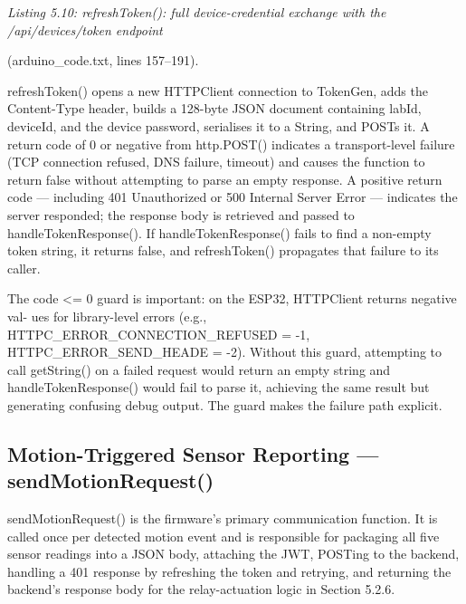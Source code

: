 \textit{Listing 5.10: refreshToken(): full device-credential exchange with the /api/devices/token endpoint}

(arduino\_code.txt, lines 157--191).


refreshToken() opens a new HTTPClient connection to TokenGen, adds the Content-Type
header, builds a 128-byte JSON document containing labId, deviceId, and the device
password, serialises it to a String, and POSTs it. A return code of 0 or negative from
http.POST() indicates a transport-level failure (TCP connection refused, DNS failure,
timeout) and causes the function to return false without attempting to parse an empty
response. A positive return code --- including 401 Unauthorized or 500 Internal Server
Error --- indicates the server responded; the response body is retrieved and passed to
handleTokenResponse(). If handleTokenResponse() fails to ﬁnd a non-empty token
string, it returns false, and refreshToken() propagates that failure to its caller.

The code <= 0 guard is important: on the ESP32, HTTPClient returns negative val-
ues for library-level errors (e.g., HTTPC\_ERROR\_CONNECTION\_REFUSED = -1, HTTPC\_ERROR\_SEND\_HEADE
= -2). Without this guard, attempting to call getString() on a failed request would return
an empty string and handleTokenResponse() would fail to parse it, achieving the same
result but generating confusing debug output. The guard makes the failure path explicit.



\subsection{Motion-Triggered Sensor Reporting --- sendMotionRequest()}


sendMotionRequest() is the ﬁrmware's primary communication function. It is called
once per detected motion event and is responsible for packaging all ﬁve sensor readings
into a JSON body, attaching the JWT, POSTing to the backend, handling a 401 response
by refreshing the token and retrying, and returning the backend's response body for the
relay-actuation logic in Section 5.2.6.





